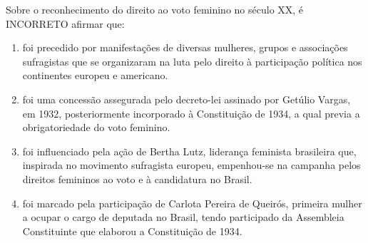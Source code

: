 Sobre o reconhecimento do direito ao voto feminino no século XX, é INCORRETO afirmar que:
\begin{enumerate}
\item foi precedido por manifestações de diversas mulheres, grupos e associações sufragistas que se
        organizaram na luta pelo direito à participação política nos continentes europeu e americano.
\item foi uma concessão assegurada pelo decreto-lei assinado por Getúlio Vargas, em 1932, posteriormente
        incorporado à Constituição de 1934, a qual previa a obrigatoriedade do voto feminino.
\item foi influenciado pela ação de Bertha Lutz, liderança feminista brasileira que, inspirada no movimento
        sufragista europeu, empenhou-se na campanha pelos direitos femininos ao voto e à candidatura no Brasil.
\item foi marcado pela participação de Carlota Pereira de Queirós, primeira mulher a ocupar o cargo de
        deputada no Brasil, tendo participado da Assembleia Constituinte que elaborou a Constituição de 1934.
\end{enumerate}
